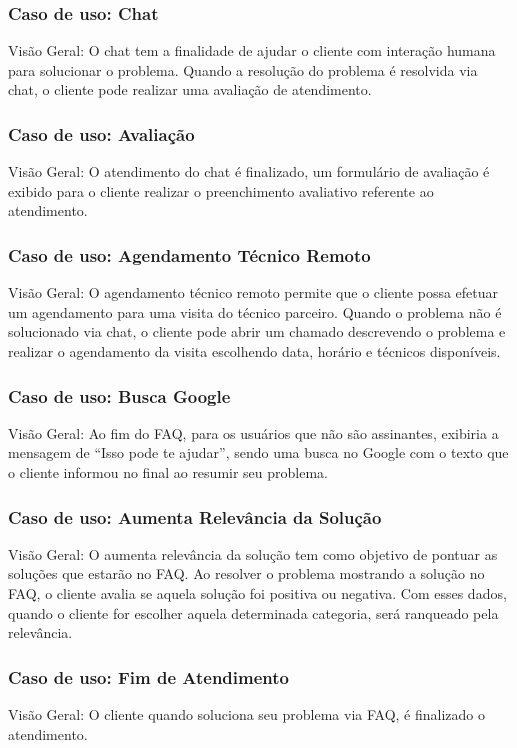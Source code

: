 \documentclass[
    12pt,               %
    openright,          %
    oneside,
    a4paper,            %
    MODELO,             %
    english,            %
    brazil              %
   ]{ifsp-spo-inf-ctds}
\begin{document}
\subsubsection{Caso de uso: Chat}
Visão Geral: O chat tem a finalidade de ajudar o cliente com interação humana para solucionar o problema. Quando a resolução do problema é resolvida via chat, o cliente pode realizar uma avaliação de atendimento.

\subsubsection{Caso de uso: Avaliação}
Visão Geral: O atendimento do chat é finalizado, um formulário de avaliação é exibido para o cliente realizar o preenchimento avaliativo referente ao atendimento.

\subsubsection{Caso de uso: Agendamento Técnico Remoto}
Visão Geral: O agendamento técnico remoto permite que o cliente possa efetuar um agendamento para uma visita do técnico parceiro. Quando o problema não é solucionado via chat, o cliente pode abrir um chamado descrevendo o problema e realizar o agendamento da visita escolhendo data, horário e técnicos disponíveis.

\subsubsection{Caso de uso: Busca Google}
Visão Geral: Ao fim do FAQ, para os usuários que não são assinantes, exibiria a mensagem de “Isso pode te ajudar”, sendo uma busca no Google com o texto que o cliente informou no final ao resumir seu problema.

\subsubsection{Caso de uso: Aumenta Relevância da Solução}
Visão Geral: O aumenta relevância da solução tem como objetivo de pontuar as soluções que estarão no FAQ. Ao resolver o problema mostrando a solução no FAQ, o cliente avalia se aquela solução foi positiva ou negativa. Com esses dados, quando o cliente for escolher aquela determinada categoria, será ranqueado pela relevância.

\subsubsection{Caso de uso: Fim de Atendimento}
Visão Geral: O cliente quando soluciona seu problema via FAQ, é finalizado o atendimento.
\end{document}
